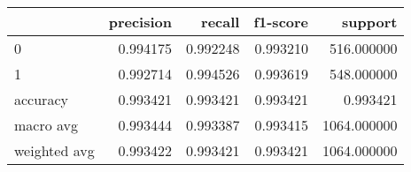 \begin{tabular}{lrrrr}
\toprule
{} &  precision &    recall &  f1-score &      support \\
\midrule
0            &   0.994175 &  0.992248 &  0.993210 &   516.000000 \\
1            &   0.992714 &  0.994526 &  0.993619 &   548.000000 \\
accuracy     &   0.993421 &  0.993421 &  0.993421 &     0.993421 \\
macro avg    &   0.993444 &  0.993387 &  0.993415 &  1064.000000 \\
weighted avg &   0.993422 &  0.993421 &  0.993421 &  1064.000000 \\
\bottomrule
\end{tabular}
